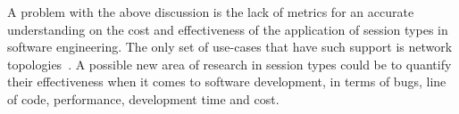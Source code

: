 A problem with the above discussion is the lack of metrics
for an accurate understanding on the cost and effectiveness
of the application of session types in software engineering.
The only set of use-cases that have such support is network
topologies~\cite{NCY2015}.
A possible new area of research in session types could
be to quantify their effectiveness when it comes to software development,
in terms of bugs, line of code, performance, development time and cost.












